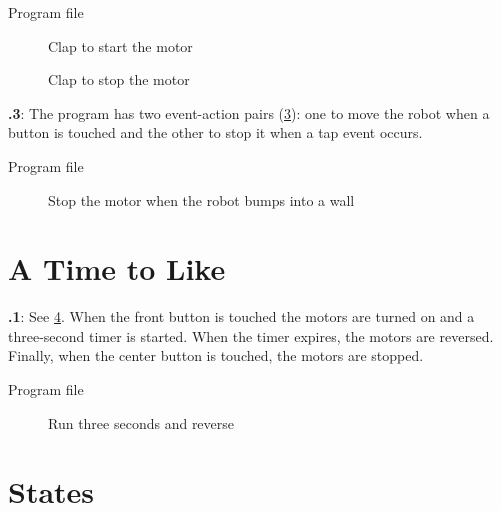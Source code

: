 \documentclass[11pt,a4paper,english]{article}
\begin{document}
{\raggedleft \hfill Program file }

\begin{figure}
\begin{center}
\caption{Clap to start the motor}\label{fig.clap-to-start}
\end{center}
\end{figure}

\begin{figure}[hbt]
\begin{center}
\caption{Clap to stop the motor}\label{fig.clap-to-stop}
\end{center}
\end{figure}

\textbf{\thesection.3}:
The program has two event-action pairs (\cref{fig.bump}): one to
move the robot when a button is touched and the other to stop it when a
tap event occurs.

{\raggedleft \hfill Program file }

\begin{figure}[hbt]
\begin{center}
\caption{Stop the motor when the robot bumps into a wall}\label{fig.bump}
\end{center}
\end{figure}

\section{A Time to Like}

\textbf{\thesection.1}:
See \cref{fig.three}. When the front button
is touched the motors are turned on and a three-second timer is started.
When the timer expires, the motors are reversed. Finally, when the
center button is touched, the motors are stopped.

{\raggedleft \hfill Program file }


\begin{figure}[hbt]
\begin{center}
\caption{Run three seconds and reverse}\label{fig.three}
\end{center}
\end{figure}


\section{States}
\end{document}
